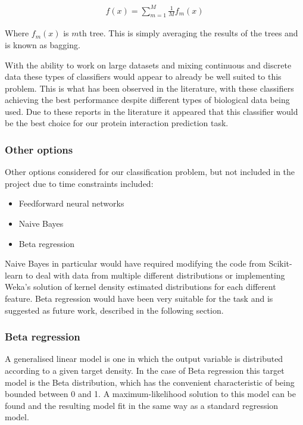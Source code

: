 \begin{align}
    f(x) = \sum_{m=1}^{M} \frac{1}{M} f_{m}(x)
\end{align}

Where $f_{m}(x)$ is $m$th tree. This is simply averaging the results of the trees and is known as bagging.

With the ability to work on large datasets and mixing continuous and discrete data these types of classifiers would appear to already be well suited to this problem.
This is what has been observed in the literature, with these classifiers achieving the best performance despite different types of biological data being used\autocites{qi_evaluation_2006,rodgers-melnick_predicting_2013}.
Due to these reports in the literature it appeared that this classifier would be the best choice for our protein interaction prediction task.


\subsubsection*{Other options}

Other options considered for our classification problem, but not included in the project due to time constraints included:

\begin{itemize}
    \item Feedforward neural networks
    \item Naive Bayes
    \item Beta regression
\end{itemize}

Naive Bayes in particular would have required modifying the code from Scikit-learn to deal with data from multiple different distributions or implementing Weka's solution of kernel density estimated distributions for each different feature\autocite{john_estimating_1995}.
Beta regression would have been very suitable for the task and is suggested as future work, described in the following section.

\subsubsection{Beta regression}

A generalised linear model is one in which the output variable is distributed according to a given target density\autocite{murphy_machine_2012}.
In the case of Beta regression\autocite{smithson_better_2006} this target model is the Beta distribution, which has the convenient characteristic of being bounded between 0 and 1.
A maximum-likelihood solution to this model can be found and the resulting model fit in the same way as a standard regression model.


